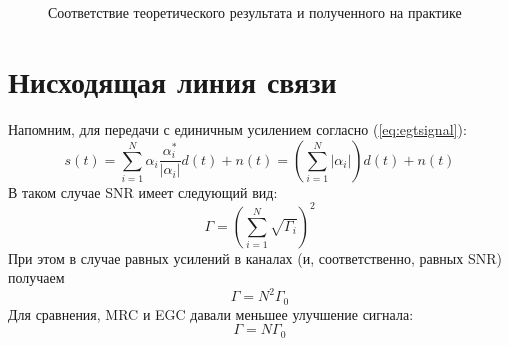 \documentclass[a4paper,12pt,oneside]{scrartcl}
\begin{document}
\begin{figure}[!htb]
\begin{minipage}[h]{1\linewidth}
 \\
\end{minipage}
\vfill
\begin{minipage}[h]{1\linewidth}
 \\
\end{minipage}
\caption{Соответствие теоретического результата и полученного на практике}
\label{fig:SNRtheory}
\end{figure}

\clearpage
\section{Нисходящая линия связи}

Напомним, для передачи с единичным усилением согласно (\ref{eq:egtsignal}):
\begin{equation}
s\left(t\right)=\sum\limits_{i=1}^N \alpha_i\frac{\alpha^*_i}{|\alpha_i|}d\left(t\right) + n\left(t\right) = \left(\sum\limits_{i=1}^N |\alpha_i|\right)d\left(t\right) + n\left(t\right)
\end{equation}
В таком случае SNR имеет следующий вид:
\begin{equation}
\Gamma = \left(\sum\limits_{i=1}^{N}\sqrt{\Gamma_i}\right)^2
\end{equation}
При этом в случае равных усилений в каналах (и, соответственно, равных SNR) получаем 
\begin{equation}
\label{eq:equalSNR}
\Gamma = N^2\Gamma_0
\end{equation}
Для сравнения, MRC и EGC давали меньшее улучшение сигнала:
\begin{equation}
\label{eq:equalSNRMRC}
\Gamma = N\Gamma_0
\end{equation}
\end{document}
